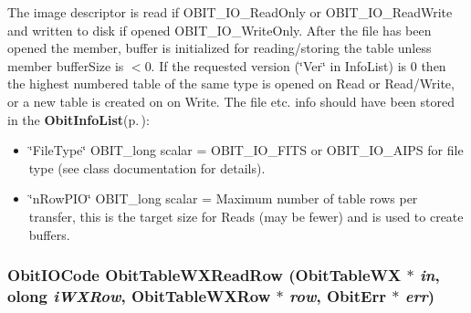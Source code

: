 The image descriptor is read if OBIT\_\-IO\_\-Read\-Only or OBIT\_\-IO\_\-Read\-Write and written to disk if opened OBIT\_\-IO\_\-Write\-Only. After the file has been opened the member, buffer is initialized for reading/storing the table unless member buffer\-Size is $<$0. If the requested version (\char`\"{}Ver\char`\"{} in Info\-List) is 0 then the highest numbered table of the same type is opened on Read or Read/Write, or a new table is created on on Write. The file etc. info should have been stored in the {\bf Obit\-Info\-List}{\rm (p.\,\pageref{structObitInfoList})}: \begin{itemize}
\item \char`\"{}File\-Type\char`\"{} OBIT\_\-long scalar = OBIT\_\-IO\_\-FITS or OBIT\_\-IO\_\-AIPS for file type (see class documentation for details). \item \char`\"{}n\-Row\-PIO\char`\"{} OBIT\_\-long scalar = Maximum number of table rows per transfer, this is the target size for Reads (may be fewer) and is used to create buffers. 
\end{itemize}
\subsubsection{\setlength{\rightskip}{0pt plus 5cm}Obit\-IOCode Obit\-Table\-WXRead\-Row ({\bf Obit\-Table\-WX} $\ast$ {\em in}, {\bf olong} {\em i\-WXRow}, {\bf Obit\-Table\-WXRow} $\ast$ {\em row}, {\bf Obit\-Err} $\ast$ {\em err})}\label{ObitTableWX_8h_a18}


